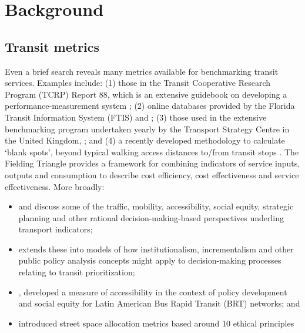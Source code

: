 \documentclass[preprint, 3p,
authoryear]{elsarticle} %
\begin{document}
\hypertarget{background}{%
\section{Background}\label{background}}

\hypertarget{transit-metrics}{%
\subsection{Transit metrics}\label{transit-metrics}}

Even a brief search reveals many metrics available for benchmarking
transit services. Examples include: (1) those in the Transit Cooperative
Research Program (TCRP) Report 88, which is an extensive guidebook on
developing a performance-measurement system \citep{Ryus:2003aa}; (2)
online databases provided by the Florida Transit Information System
(FTIS) \citep{Florida-Transit-Information-System:2018aa} and
\citet{UITP:2015aa}; (3) those used in the extensive benchmarking
program undertaken yearly by the Transport Strategy Centre in the United
Kingdom, \citep{Imperial-College-London:2023aa}; and (4) a recently
developed methodology to calculate `blank spots', beyond typical walking
access distances to/from transit stops \citep{AlamriSultan2023GAoA}. The
Fielding Triangle \citep{FieldingGordonJ1987Mpts} provides a framework
for combining indicators of service inputs, outputs and consumption to
describe cost efficiency, cost effectiveness and service effectiveness.
More broadly:

\begin{itemize}
\item
  \citet{Litman:2003ab} and \citet{Litman:2016aa} discuss some of the
  traffic, mobility, accessibility, social equity, strategic planning
  and other rational decision-making-based perspectives underling
  transport indicators;
\item
  \citet{Reynolds:2017ah} extends these into models of how
  institutionalism, incrementalism and other public policy analysis
  concepts might apply to decision-making processes relating to transit
  prioritization;
\item
  \citet{GuzmanLuisA.2017Aeit}, developed a measure of accessibility in
  the context of policy development and social equity for Latin American
  Bus Rapid Transit (BRT) networks; and
\item
  \citet{Creutzig2020streetspaceallocation} introduced street space
  allocation metrics based around 10 ethical principles
\end{itemize}
\end{document}
